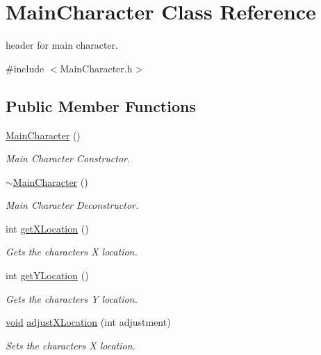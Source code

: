 \hypertarget{class_main_character}{}\section{Main\+Character Class Reference}
\label{class_main_character}


header for main character.  




{\ttfamily \#include $<$Main\+Character.\+h$>$}

\subsection*{Public Member Functions}
\begin{DoxyCompactItemize}
\item 
\mbox{\hyperlink{class_main_character_a822c6796f6cac04dedfaa12846f1dd42}{Main\+Character}} ()
\begin{DoxyCompactList}\small\item\em Main Character Constructor. \end{DoxyCompactList}\item 
\mbox{\hyperlink{class_main_character_a6d7d97ce443fa977a798ea1c956b0fc1}{$\sim$\+Main\+Character}} ()
\begin{DoxyCompactList}\small\item\em Main Character Deconstructor. \end{DoxyCompactList}\item 
int \mbox{\hyperlink{class_main_character_a1620795cfdb0168e4d67b31ca2b20c0f}{get\+X\+Location}} ()
\begin{DoxyCompactList}\small\item\em Gets the character\textquotesingle{}s X location. \end{DoxyCompactList}\item 
int \mbox{\hyperlink{class_main_character_a4f8b39a1d6b2a69776e2ae32492d98d9}{get\+Y\+Location}} ()
\begin{DoxyCompactList}\small\item\em Gets the character\textquotesingle{}s Y location. \end{DoxyCompactList}\item 
\mbox{\hyperlink{_s_d_l__opengles2__gl2ext_8h_ae5d8fa23ad07c48bb609509eae494c95}{void}} \mbox{\hyperlink{class_main_character_a7564a6018d48b1037649045d93d62381}{adjust\+X\+Location}} (int adjustment)
\begin{DoxyCompactList}\small\item\em Sets the character\textquotesingle{}s X location. \end{DoxyCompactList}\item 

\end{DoxyCompactItemize}
